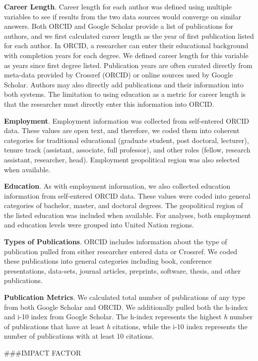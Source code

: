 \documentclass[
  english,
  man]{apa6}
\begin{document}
\textbf{Career Length}. Career length for each author was defined using multiple variables to see if results from the two data sources would converge on similar answers. Both ORCID and Google Scholar provide a list of publications for authors, and we first calculated career length as the year of first publication listed for each author. In ORCID, a researcher can enter their educational background with completion years for each degree. We defined career length for this variable as years since first degree listed. Publication years are often curated directly from meta-data provided by Crossref (ORCID) or online sources used by Google Scholar. Authors may also directly add publications and their information into both systems. The limitation to using education as a metric for career length is that the researcher must directly enter this information into ORCID.

\textbf{Employment}. Employment information was collected from self-entered ORCID data. These values are open text, and therefore, we coded them into coherent categories for traditional educational (graduate student, post doctoral, lecturer), tenure track (assistant, associate, full professor), and other roles (fellow, research assistant, researcher, head). Employment geopolitical region was also selected when available.

\textbf{Education}. As with employment information, we also collected education information from self-entered ORCID data. These values were coded into general categories of bachelor, master, and doctoral degrees. The geopolitical region of the listed education was included when available. For analyses, both employment and education levels were grouped into United Nation regions.

\textbf{Types of Publications}. ORCID includes information about the type of publication pulled from either researcher entered data or Crossref. We coded these publications into general categories including book, conference presentations, data-sets, journal articles, preprints, software, thesis, and other publications.

\textbf{Publication Metrics}. We calculated total number of publications of any type from both Google Scholar and ORCID. We additionally pulled both the h-index and i-10 index from Google Scholar. The h-index represents the highest \emph{h} number of publications that have at least \emph{h} citations, while the i-10 index represents the number of publications with at least 10 citations.

###IMPACT FACTOR 
\end{document}

